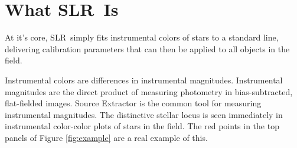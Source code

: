 \documentclass{report}
\newcommand{\slr}{SLR}
\begin{document}
\section{What \slr\ Is}

At it's core, \slr\ simply fits instrumental colors of stars to a
standard line, delivering calibration parameters that can then be
applied to all objects in the field.

Instrumental colors are differences in instrumental magnitudes.
Instrumental magnitudes are the direct product of measuring photometry
in bias-subtracted, flat-fielded images.  Source Extractor
\citep{bib:sextractor} is the common tool for measuring instrumental
magnitudes.  The distinctive stellar locus is seen immediately in
instrumental color-color plots of stars in the field.  The red points
in the top panels of Figure \ref{fig:example} are a real example of
this.
\end{document}
